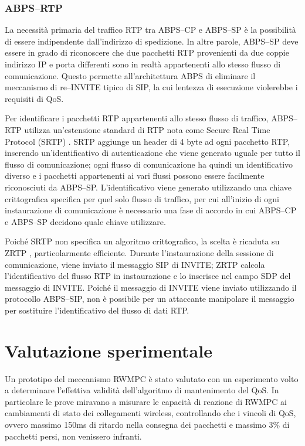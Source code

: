 \documentclass[12pt,a4paper,openright,twoside]{book}
\begin{document}
\subsubsection{ABPS--RTP}

La necessità primaria del traffico RTP tra ABPS--CP e ABPS--SP è la
possibilità di essere indipendente dall'indirizzo di spedizione. In
altre parole, ABPS--SP deve essere in grado di riconoscere che due
pacchetti RTP provenienti da due coppie indirizzo IP e porta
differenti sono in realtà appartenenti allo stesso flusso di
comunicazione. Questo permette all'architettura ABPS di eliminare il
meccanismo di re--INVITE tipico di SIP, la cui lentezza di esecuzione
violerebbe i requisiti di QoS.

Per identificare i pacchetti RTP appartenenti allo stesso flusso di
traffico, ABPS--RTP utilizza un'estensione standard di RTP nota come
Secure Real Time Protocol (SRTP) \cite{bib:srtp}. SRTP aggiunge un
header di 4 byte ad ogni pacchetto RTP, inserendo un'identificativo di
autenticazione che viene generato uguale per tutto il flusso di
comunicazione; ogni flusso di comunicazione ha quindi un
identificativo diverso e i pacchetti appartenenti ai vari flussi
possono essere facilmente riconosciuti da ABPS--SP. L'identificativo
viene generato utilizzando una chiave crittografica specifica per quel
solo flusso di traffico, per cui all'inizio di ogni instaurazione di
comunicazione è necessario una fase di accordo in cui ABPS--CP e
ABPS--SP decidono quale chiave utilizzare.

Poiché SRTP non specifica un algoritmo crittografico, la scelta è
ricaduta su ZRTP \cite{bib:zrtp}, particolarmente efficiente. Durante
l'instaurazione della sessione di comunicazione, viene inviato il
messaggio SIP di INVITE; ZRTP calcola l'identificativo del flusso RTP
in instaurazione e lo inserisce nel campo SDP del messaggio di
INVITE. Poiché il messaggio di INVITE viene inviato utilizzando il
protocollo ABPS--SIP, non è possibile per un attaccante manipolare il
messaggio per sostituire l'identificativo del flusso di dati RTP.

\section{Valutazione sperimentale}

Un prototipo del meccanismo RWMPC è stato valutato con un esperimento
volto a determinare l'effettiva validità dell'algoritmo di
mantenimento del QoS. In particolare le prove miravano a misurare le
capacità di reazione di RWMPC ai cambiamenti di stato dei collegamenti
wireless, controllando che i vincoli di QoS, ovvero massimo 150ms di
ritardo nella consegna dei pacchetti e massimo 3\% di pacchetti persi,
non venissero infranti.
\end{document}
